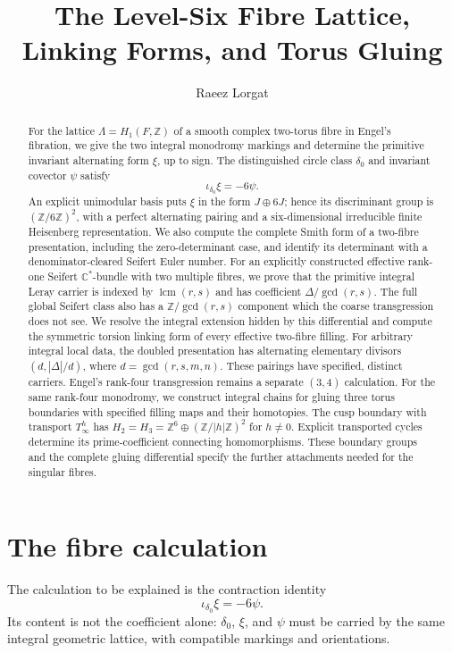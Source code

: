 \documentclass[11pt]{article}
\title{The Level-Six Fibre Lattice, Linking Forms, and Torus Gluing}
\author{Raeez Lorgat}
\date{}
\numberwithin{equation}{section}
\begin{document}
\maketitle

\begin{abstract}
For the lattice $\Lambda=H_1(F,\mathbb Z)$ of a smooth complex two-torus
fibre in Engel's fibration, we give the two integral monodromy markings
and determine the primitive invariant alternating form $\xi$, up to sign.  The
distinguished circle class $\delta_0$ and invariant covector $\psi$ satisfy
\[
                 \iota_{\delta_0}\xi=-6\psi.
\]
An explicit unimodular basis puts $\xi$ in the form $J\oplus6J$; hence its
discriminant group is $(\mathbb Z/6\mathbb Z)^2$, with a perfect alternating
pairing and a six-dimensional irreducible finite Heisenberg representation.
We also compute the complete Smith form of a two-fibre presentation,
including the zero-determinant case, and identify its determinant with a
denominator-cleared Seifert Euler number.  For an explicitly constructed
effective rank-one Seifert $\mathbb C^*$-bundle with two multiple fibres, we
prove that the primitive integral Leray carrier is indexed by
$\operatorname{lcm}(r,s)$ and has coefficient
$\Delta/\gcd(r,s)$.  The full global Seifert class also has a
$\mathbb Z/\gcd(r,s)$ component which the coarse transgression does not see.
We resolve the integral extension hidden by this differential and compute
the symmetric torsion linking form of every effective two-fibre filling.
For arbitrary integral local data, the doubled presentation has alternating
elementary divisors $(d,|\Delta|/d)$, where $d=\gcd(r,s,m,n)$.
These pairings have specified, distinct carriers.  Engel's rank-four
transgression remains a separate $(3,4)$ calculation.
For the same rank-four monodromy, we construct integral chains for gluing
three torus boundaries with specified filling maps and their homotopies.
The cusp boundary with transport $T_\infty^h$ has
$H_2=H_3=\mathbb Z^6\oplus(\mathbb Z/|h|\mathbb Z)^2$ for
$h\ne0$. Explicit transported cycles determine its prime-coefficient
connecting homomorphisms. These boundary groups and the complete gluing
differential specify the further attachments needed for the singular fibres.
\end{abstract}

\section{The fibre calculation}

The calculation to be explained is the contraction identity
\[
                         \iota_{\delta_0}\xi=-6\psi.       \tag{1.1}
\]
Its content is not the coefficient alone: $\delta_0$, $\xi$, and $\psi$
must be carried by the same integral geometric lattice, with compatible
markings and orientations.
\end{document}
